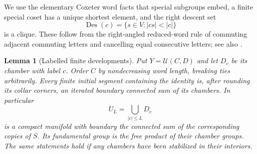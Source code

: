 \documentclass[11pt]{article}
\newtheorem{lemma}[theorem]{Lemma}
\theoremstyle{definition}
\theoremstyle{remark}
\begin{document}
We use the elementary Coxeter word facts that special subgroups embed,
a finite special coset has a unique shortest element, and the right
descent set
\[
 \operatorname{Des}(c)=\{s\in V:|cs|<|c|\}
\]
is a clique.  These follow from the right-angled reduced-word rule of
commuting adjacent commuting letters and cancelling equal consecutive
letters; see also \cite[Chapters~4--5]{Davis}.

\begin{lemma}[Labelled finite developments]
\label{rf:shelling}
Put $Y=\mathcal U(C,D)$ and let $D_c$ be its chamber with label $c$.
Order $C$ by nondecreasing word length, breaking ties arbitrarily.
Every finite initial segment containing the identity is, after rounding
its collar corners, an iterated boundary connected sum of its chambers.
In particular
\[
 U_L=\bigcup_{|c|\leq L}D_c
\]
is a compact manifold with boundary the connected sum of the corresponding
copies of $S$.  Its fundamental group is the free product of their
chamber groups.  The same statements hold if any chambers have been
stabilized in their interiors.
\end{lemma}
\end{document}
